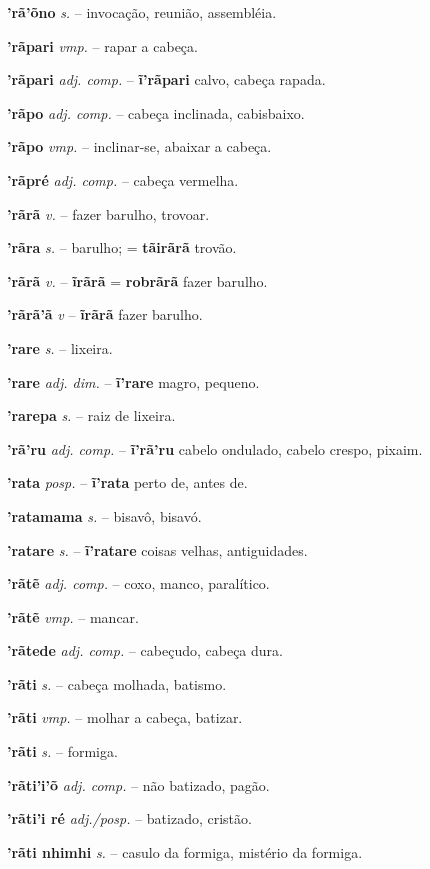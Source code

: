\textbf{'rã'õno} \textit{s.} -- invocação, reunião, assembléia.

\textbf{'rãpari} \textit{vmp.} -- rapar a cabeça.

\textbf{'rãpari} \textit{adj. comp.} -- \textbf{ĩ'rãpari} calvo, cabeça rapada.

\textbf{'rãpo} \textit{adj. comp.} -- cabeça inclinada, cabisbaixo.

\textbf{'rãpo} \textit{vmp.} -- inclinar-se, abaixar a cabeça.

\textbf{'rãpré} \textit{adj. comp.} -- cabeça vermelha.

\textbf{'rãrã} \textit{v.} -- fazer barulho, trovoar.

\textbf{'rãra} \textit{s.} -- barulho; = \textbf{tãirãrã} trovão.

\textbf{'rãrã} \textit{v.} -- \textbf{ĩrãrã} = \textbf{robrãrã} fazer barulho.

\textbf{'rãrã'ã} \textit{v} -- \textbf{ĩrãrã} fazer barulho.

\textbf{'rare} \textit{s.} -- lixeira.

\textbf{'rare} \textit{adj. dim.} -- \textbf{ĩ'rare} magro, pequeno.

\textbf{'rarepa} \textit{s.} -- raiz de lixeira.

\textbf{'rã'ru} \textit{adj. comp.} -- \textbf{ĩ'rã'ru} cabelo ondulado, cabelo crespo, pixaim.

\textbf{'rata} \textit{posp.} -- \textbf{ĩ'rata} perto de, antes de.

\textbf{'ratamama} \textit{s.} -- bisavô, bisavó.

\textbf{'ratare} \textit{s.} -- \textbf{ĩ'ratare} coisas velhas, antiguidades.

\textbf{'rãtẽ} \textit{adj. comp.} -- coxo, manco, paralítico.

\textbf{'rãtẽ} \textit{vmp.} -- mancar.

\textbf{'rãtede} \textit{adj. comp.} -- cabeçudo, cabeça dura.

\textbf{'rãti} \textit{s.} -- cabeça molhada, batismo.

\textbf{'rãti} \textit{vmp.} -- molhar a cabeça, batizar.

\textbf{'rãti} \textit{s.} -- formiga.

\textbf{'rãti'i'õ} \textit{adj. comp.} -- não batizado, pagão.

\textbf{'rãti'i ré} \textit{adj./posp.} -- batizado, cristão.

\textbf{'rãti nhimhi} \textit{s.} -- casulo da formiga, mistério da formiga.

